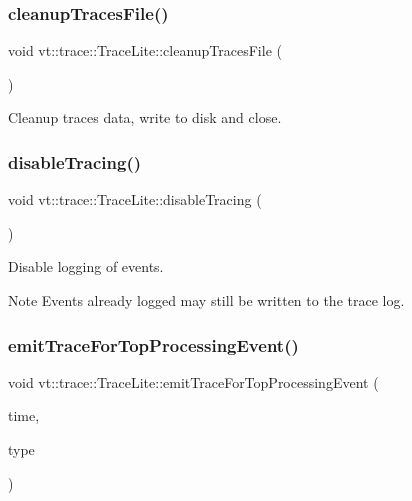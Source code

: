 \subsubsection{\texorpdfstring{cleanup\+Traces\+File()}{cleanupTracesFile()}}
{\footnotesize\ttfamily void vt\+::trace\+::\+Trace\+Lite\+::cleanup\+Traces\+File (\begin{DoxyParamCaption}{ }\end{DoxyParamCaption})}



Cleanup traces data, write to disk and close. 

\mbox{\label{structvt_1_1trace_1_1_trace_lite_ac494fd6858647fd548b6554cf066568b}} 
\subsubsection{\texorpdfstring{disable\+Tracing()}{disableTracing()}}
{\footnotesize\ttfamily void vt\+::trace\+::\+Trace\+Lite\+::disable\+Tracing (\begin{DoxyParamCaption}{ }\end{DoxyParamCaption})}



Disable logging of events. 

\begin{DoxyNote}{Note}
Events already logged may still be written to the trace log. 
\end{DoxyNote}
\mbox{\label{structvt_1_1trace_1_1_trace_lite_a6d33deb4bef608ff3c68dcf80b2fcc42}} 
\subsubsection{\texorpdfstring{emit\+Trace\+For\+Top\+Processing\+Event()}{emitTraceForTopProcessingEvent()}}
{\footnotesize\ttfamily void vt\+::trace\+::\+Trace\+Lite\+::emit\+Trace\+For\+Top\+Processing\+Event (\begin{DoxyParamCaption}\item[{double const}]{time,  }\item[{\hyperlink{namespacevt_1_1trace_acf454dfbd581b0ebae895f90b5927a1d}{Trace\+Constants\+Type} const}]{type }\end{DoxyParamCaption})\hspace{0.3cm}{\ttfamily [protected]}}



